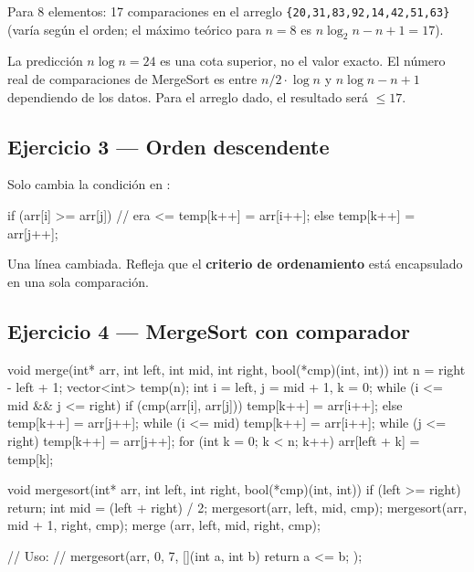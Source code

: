 \documentclass[12pt, oneside]{article}
\begin{document}
Para 8 elementos: 17 comparaciones en el arreglo \texttt{\{20,31,83,92,14,42,51,63\}}
(varía según el orden; el máximo teórico para $n=8$ es $n\log_2 n - n + 1 = 17$).

\begin{notaprofesor}
  La predicción $n \log n = 24$ es una cota superior, no el valor exacto.
  El número real de comparaciones de MergeSort es entre $n/2 \cdot \log n$
  y $n \log n - n + 1$ dependiendo de los datos. Para el arreglo dado, el
  resultado será $\leq 17$.
\end{notaprofesor}

\subsection{Ejercicio 3 — Orden descendente}

Solo cambia la condición en :
\begin{codigo}
if (arr[i] >= arr[j])   // era <=
    temp[k++] = arr[i++];
else
    temp[k++] = arr[j++];
\end{codigo}

Una línea cambiada. Refleja que el \textbf{criterio de ordenamiento} está
encapsulado en una sola comparación.

\subsection{Ejercicio 4 — MergeSort con comparador}

\begin{codigo}
void merge(int* arr, int left, int mid, int right,
           bool(*cmp)(int, int)) {
    int n = right - left + 1;
    vector<int> temp(n);
    int i = left, j = mid + 1, k = 0;
    while (i <= mid && j <= right) {
        if (cmp(arr[i], arr[j])) temp[k++] = arr[i++];
        else                     temp[k++] = arr[j++];
    }
    while (i <= mid)   temp[k++] = arr[i++];
    while (j <= right) temp[k++] = arr[j++];
    for (int k = 0; k < n; k++) arr[left + k] = temp[k];
}

void mergesort(int* arr, int left, int right,
               bool(*cmp)(int, int)) {
    if (left >= right) return;
    int mid = (left + right) / 2;
    mergesort(arr, left,    mid,   cmp);
    mergesort(arr, mid + 1, right, cmp);
    merge    (arr, left, mid, right, cmp);
}

// Uso:
// mergesort(arr, 0, 7, [](int a, int b){ return a <= b; });
\end{codigo}
\end{document}
